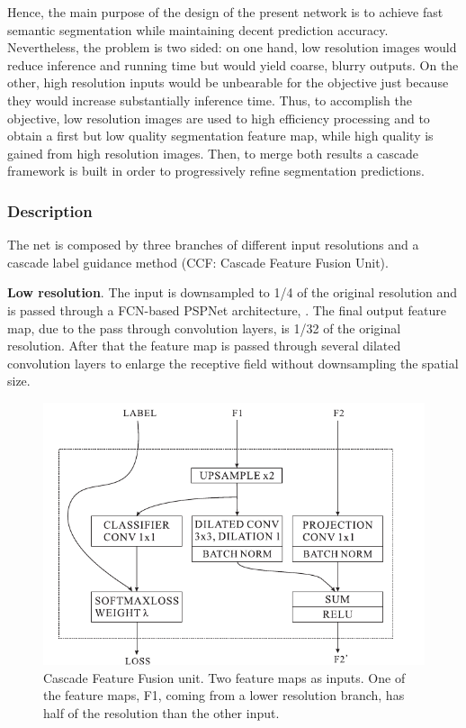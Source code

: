 Hence, the main purpose of the design of the present network is to achieve fast semantic segmentation while maintaining decent prediction accuracy. Nevertheless, the problem is two sided: on one hand, low resolution images would reduce inference and running time but would yield coarse, blurry outputs. On the other, high resolution inputs would be unbearable for the objective just because they would increase substantially inference time. Thus, to accomplish the objective, low resolution images are used to high efficiency processing and to obtain a first but low quality segmentation feature map, while high quality is gained from high resolution images. Then, to merge both results a cascade framework is built in order to progressively refine segmentation predictions.

\subsubsection{Description}

The net is composed by three branches of different input resolutions and a cascade label guidance method (CCF: Cascade Feature Fusion Unit).\newline

\textbf{Low resolution}. The input is downsampled to 1/4 of the original resolution and is passed through a FCN-based PSPNet architecture, \parencite{Reference22}. The final output feature map, due to the pass through convolution layers, is 1/32 of the original resolution. After that the feature map is passed through several dilated convolution layers to enlarge the receptive field without downsampling the spatial size.\newline


\begin{figure}
\begin{center}
\includegraphics[scale=0.55]{ccf.png}
\caption{Cascade Feature Fusion unit. Two feature maps as inputs. One of the feature maps, F1, coming from a lower resolution branch, has half of the resolution than the other input.}
\label{ccf}
\end{center}
\end{figure}

